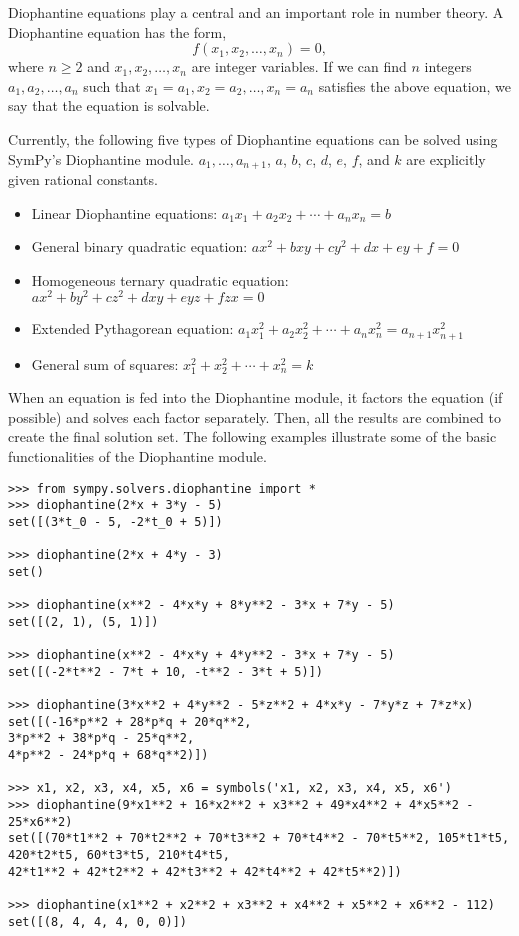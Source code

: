 Diophantine equations play a central and an important role in number theory.  A
Diophantine equation has the form, \[f(x_1, x_2, \dotsc, x_n) = 0,\] where $n \geq
2$ and $x_1, x_2, \dotsc, x_n$ are integer variables. If we can find $n$
integers $a_1, a_2, \dotsc, a_n$ such that $x_1 = a_1, x_2 = a_2, \dotsc, x_n =
a_n$ satisfies the above equation, we say that the equation is solvable.

Currently, the following five types of Diophantine equations can be solved using
SymPy's Diophantine module. $a_1, \ldots, a_{n+1}$, $a$, $b$, $c$, $d$, $e$,
$f$, and $k$ are explicitly given rational constants.

\begin{itemize}
    \item Linear Diophantine equations: $a_1x_1 + a_2x_2 + \dotsb{} + a_{n}x_{n} = b$
    \item General binary quadratic equation: $ax^2 + bxy + cy^2 + dx + ey + f = 0$
    \item Homogeneous ternary quadratic equation: $ax^2 + by^2 + cz^2 + dxy + eyz + fzx = 0$
    \item Extended Pythagorean equation: $a_{1}x_{1}^2 + a_{2}x_{2}^2 + \dotsb{} + a_{n}x_{n}^2 = a_{n+1}x_{n+1}^2$
    \item General sum of squares: $x_{1}^2 + x_{2}^2 + \dotsb{} + x_{n}^2 = k$
\end{itemize}

When an equation is fed into the Diophantine module, it factors the equation (if
possible) and solves each factor separately. Then, all the results are combined
to create the final solution set. The following examples illustrate some of the
basic functionalities of the Diophantine module.

\begin{verbatim}
>>> from sympy.solvers.diophantine import *
>>> diophantine(2*x + 3*y - 5)
set([(3*t_0 - 5, -2*t_0 + 5)])

>>> diophantine(2*x + 4*y - 3)
set()

>>> diophantine(x**2 - 4*x*y + 8*y**2 - 3*x + 7*y - 5)
set([(2, 1), (5, 1)])

>>> diophantine(x**2 - 4*x*y + 4*y**2 - 3*x + 7*y - 5)
set([(-2*t**2 - 7*t + 10, -t**2 - 3*t + 5)])

>>> diophantine(3*x**2 + 4*y**2 - 5*z**2 + 4*x*y - 7*y*z + 7*z*x)
set([(-16*p**2 + 28*p*q + 20*q**2,
3*p**2 + 38*p*q - 25*q**2,
4*p**2 - 24*p*q + 68*q**2)])

>>> x1, x2, x3, x4, x5, x6 = symbols('x1, x2, x3, x4, x5, x6')
>>> diophantine(9*x1**2 + 16*x2**2 + x3**2 + 49*x4**2 + 4*x5**2 - 25*x6**2)
set([(70*t1**2 + 70*t2**2 + 70*t3**2 + 70*t4**2 - 70*t5**2, 105*t1*t5,
420*t2*t5, 60*t3*t5, 210*t4*t5,
42*t1**2 + 42*t2**2 + 42*t3**2 + 42*t4**2 + 42*t5**2)])

>>> diophantine(x1**2 + x2**2 + x3**2 + x4**2 + x5**2 + x6**2 - 112)
set([(8, 4, 4, 4, 0, 0)])
\end{verbatim}

